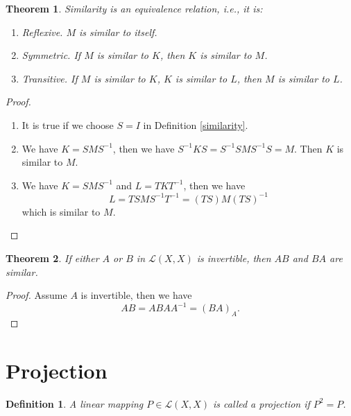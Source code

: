 \documentclass[11pt]{book}
\newtheorem{definition}{Definition}[section]
\newtheorem{theorem}{Theorem}[section]
\theoremstyle{definition}
\numberwithin{equation}{chapter}
\begin{document}
\begin{theorem}
Similarity is an equivalence relation, i.e., it is:
\begin{enumerate}[label=(\alph*)]
    \item Reflexive. $M$ is similar to itself.
    \item Symmetric. If $M$ is similar to $K$, then $K$ is similar to $M$.
    \item Transitive. If $M$ is similar to $K$, $K$ is similar to $L$, then $M$ is similar to $L$.
\end{enumerate}
\end{theorem}
\begin{proof}
~\begin{enumerate}[label=(\alph*)]
    \item It is true if we choose $S=I$ in Definition \ref{similarity}.
    \item We have $K = SMS^{-1}$, then we have $S^{-1}KS = S^{-1} S M S^{-1} S = M$. Then $K$ is similar to $M$.
    \item We have $K = SMS^{-1}$ and $L=TKT^{-1}$, then we have $$L = TSMS^{-1}T^{-1} = (TS)M(TS)^{-1}$$ which is similar to $M$.
\end{enumerate}
\end{proof}

\medskip

\begin{theorem}
If either $A$ or $B$ in $\mathscr{L}(X,X)$ is invertible, then $AB$ and $BA$ are similar.
\end{theorem}
\begin{proof}
Assume $A$ is invertible, then we have 
$$AB = ABAA^{-1} = (BA)_A.$$
\end{proof}

\medskip

\section{Projection}
\begin{definition}
A linear mapping $P\in \mathscr{L}(X,X)$ is called a projection if $P^2=P$.
\end{definition}

\medskip
\end{document}
